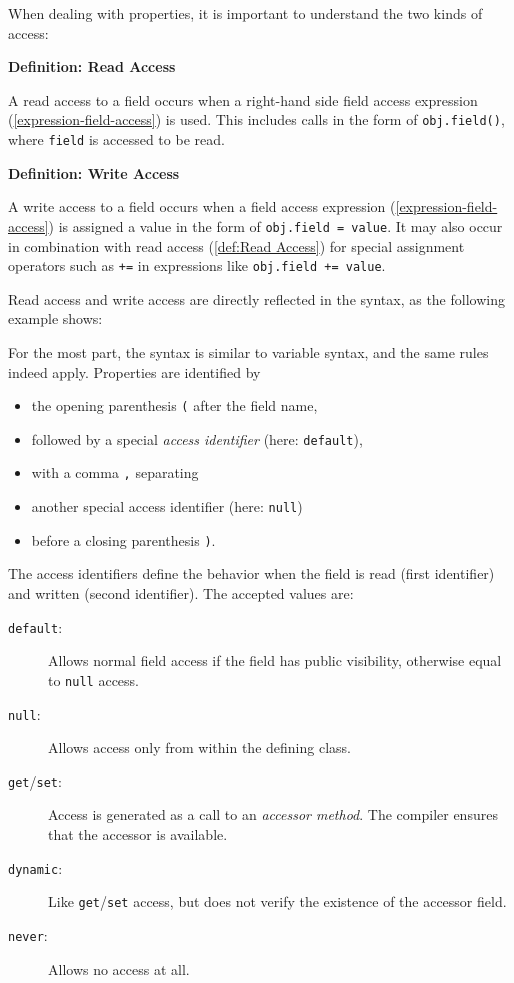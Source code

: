 \documentclass[a4paper,oneside]{book}
\newcommand{\expr}[1]{\texttt{#1}}
\newenvironment{myshaded}
  {\def\FrameCommand{\fboxsep=\topsep\colorbox{bgcolor}}%
  \MakeFramed {\advance\hsize-\width \FrameRestore}}%
 {\endMakeFramed}
\newcommand{\define}[3][Definition]
	{\begin{myshaded}\noindent\textbf{#1: #2}\par\nobreak\noindent\ignorespaces#3\label{def:#2}\end{myshaded}}
\newcommand{\tref}[2]{#1 (\ref{#2})}
\newcommand{\haxe}[2][]{%
}
\begin{document}
When dealing with properties, it is important to understand the two kinds of access:

\define{Read Access}{A read access to a field occurs when a right-hand side \tref{field access expression}{expression-field-access} is used. This includes calls in the form of \expr{obj.field()}, where \expr{field} is accessed to be read.}

\define{Write Access}{A write access to a field occurs when a \tref{field access expression}{expression-field-access} is assigned a value in the form of \expr{obj.field = value}. It may also occur in combination with \tref{read access}{def:Read Access} for special assignment operators such as \expr{+=} in expressions like \expr{obj.field += value}.} 

Read access and write access are directly reflected in the syntax, as the following example shows:

\haxe{assets/Property.hx}

For the most part, the syntax is similar to variable syntax, and the same rules indeed apply. Properties are identified by

\begin{itemize}
	\item the opening parenthesis \expr{(} after the field name,
	\item followed by a special \emph{access identifier} (here: \expr{default}),
	\item with a comma \expr{,} separating
	\item another special access identifier (here: \expr{null})
	\item before a closing parenthesis \expr{)}.
\end{itemize}

The access identifiers define the behavior when the field is read (first identifier) and written (second identifier). The accepted values are:

\begin{description}
	\item[\expr{default}:] Allows normal field access if the field has public visibility, otherwise equal to \expr{null} access.
	\item[\expr{null}:] Allows access only from within the defining class.
	\item[\expr{get}/\expr{set}:] Access is generated as a call to an \emph{accessor method}. The compiler ensures that the accessor is available.
	\item[\expr{dynamic}:] Like \expr{get}/\expr{set} access, but does not verify the existence of the accessor field.
	\item[\expr{never}:] Allows no access at all.
\end{description}
\end{document}
